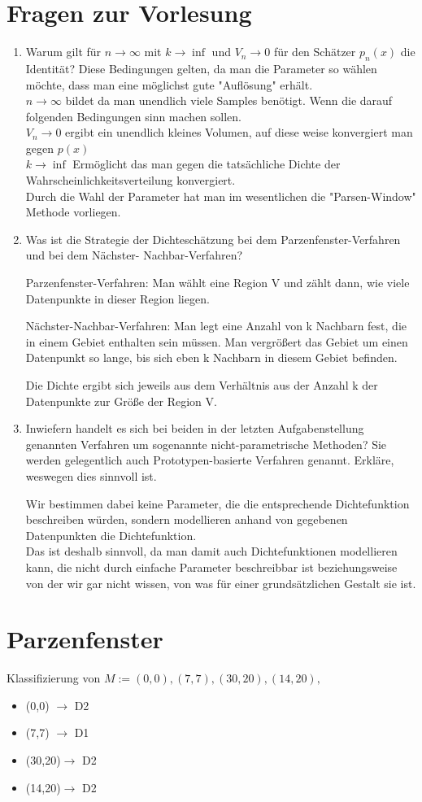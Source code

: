 \documentclass[a4paper]{scrartcl}
\begin{document}
\section{Fragen zur Vorlesung}
\begin{enumerate}
	\item Warum gilt für $n\rightarrow\infty$ mit $k\rightarrow\inf$ und $V_n \rightarrow 0$ für den Schätzer $p_n(x)$ die Identität?
	Diese Bedingungen gelten, da man die Parameter so wählen möchte, dass man eine möglichst gute "Auflösung" erhält. \\
	$n\rightarrow\infty$ bildet da man unendlich viele Samples benötigt. Wenn die darauf folgenden Bedingungen sinn machen sollen. \\
	$V_n \rightarrow 0$ ergibt ein unendlich kleines Volumen, auf diese weise konvergiert man gegen $p(x)$\\
	$k\rightarrow\inf$ Ermöglicht das man gegen die tatsächliche Dichte der Wahrscheinlichkeitsverteilung konvergiert. \\
	Durch die Wahl der Parameter hat man im wesentlichen die "Parsen-Window" Methode vorliegen.  
		
	\item Was ist die Strategie der Dichteschätzung bei dem Parzenfenster-Verfahren und bei dem Nächster-
	Nachbar-Verfahren?
	
	Parzenfenster-Verfahren: Man wählt eine Region V und zählt dann, wie viele Datenpunkte in dieser Region liegen.
	
	Nächster-Nachbar-Verfahren: Man legt eine Anzahl von k Nachbarn fest, die in einem Gebiet enthalten sein müssen. Man vergrößert das Gebiet um einen Datenpunkt so lange, bis sich eben k Nachbarn in diesem Gebiet befinden.
	
	Die Dichte ergibt sich jeweils aus dem Verhältnis aus der Anzahl k der Datenpunkte zur Größe der Region V.
	
	\item Inwiefern handelt es sich bei beiden in der letzten Aufgabenstellung genannten Verfahren um
	sogenannte nicht-parametrische Methoden? Sie werden gelegentlich auch Prototypen-basierte
	Verfahren genannt. Erkläre, weswegen dies sinnvoll ist.
	
	Wir bestimmen dabei keine Parameter, die die entsprechende Dichtefunktion beschreiben würden, sondern modellieren anhand von gegebenen Datenpunkten die Dichtefunktion.\\
	Das ist deshalb sinnvoll, da man damit auch Dichtefunktionen modellieren kann, die nicht durch einfache Parameter beschreibbar ist beziehungsweise von der wir gar nicht wissen, von was für einer grundsätzlichen Gestalt sie ist.
\end{enumerate}

\section{Parzenfenster}
Klassifizierung von $M:={(0,0),(7,7),(30,20),(14,20),}$

\begin{itemize}
	\item (0,0) $\rightarrow$ D2
	\item (7,7) $\rightarrow$ D1
	\item (30,20)$\rightarrow$ D2
	\item (14,20)$\rightarrow$ D2
\end{itemize}
\end{document}
